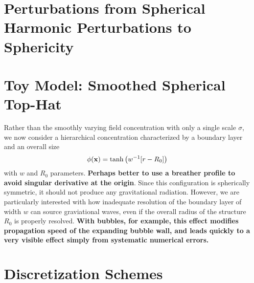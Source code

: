 \documentclass{revtex4}
\begin{document}
\section{Perturbations from Spherical Harmonic Perturbations to Sphericity}

\section{Toy Model: Smoothed Spherical Top-Hat}
Rather than the smoothly varying field concentration with only a single scale $\sigma$, we now consider a hierarchical concentration characterized by a boundary layer and an overall size
\begin{equation}
  \phi({\bf x}) = \tanh\left(w^{-1}[r-R_0]\right)
\end{equation}
with $w$ and $R_0$ parameters.
{\bf Perhaps better to use a breather profile to avoid singular derivative at the origin}.
Since this configuration is spherically symmetric, it should not produce any gravitational radiation.
However, we are particularly interested with how inadequate resolution of the boundary layer of width $w$ can source graviational waves, even if the overall radius of the structure $R_0$ is properly resolved.
{\bf With bubbles, for example, this effect modifies propagation speed of the expanding bubble wall, and leads quickly to a very visible effect simply from systematic numerical errors.}



\section{Discretization Schemes}
\end{document}

